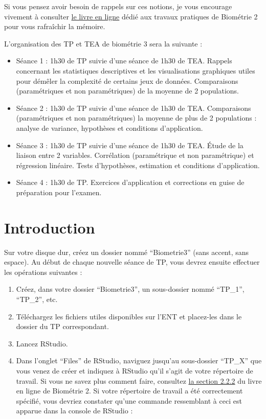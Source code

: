 \documentclass[
  a4paper,
]{article}
\providecommand{\tightlist}{%
  \setlength{\itemsep}{0pt}\setlength{\parskip}{0pt}}
\begin{document}
Si vous pensez avoir besoin de rappels sur ces notions, je vous encourage vivement à consulter \href{https://besibo.github.io/Biometrie2/}{le livre en ligne} dédié aux travaux pratiques de Biométrie 2 pour vous rafraîchir la mémoire.

L'organisation des TP et TEA de biométrie 3 sera la suivante :

\begin{itemize}
\tightlist
\item
  Séance 1 : 1h30 de TP suivie d'une séance de 1h30 de TEA. Rappels concernant les statistiques descriptives et les visualisations graphiques utiles pour démêler la complexité de certains jeux de données. Comparaisons (paramétriques et non paramétriques) de la moyenne de 2 populations.
\item
  Séance 2 : 1h30 de TP suivie d'une séance de 1h30 de TEA. Comparaisons (paramétriques et non paramétriques) la moyenne de plus de 2 populations : analyse de variance, hypothèses et conditions d'application.
\item
  Séance 3 : 1h30 de TP suivie d'une séance de 1h30 de TEA. Étude de la liaison entre 2 variables. Corrélation (paramétrique et non paramétrique) et régression linéaire. Tests d'hypothèses, estimation et conditions d'application.
\item
  Séance 4 : 1h30 de TP. Exercices d'application et corrections en guise de préparation pour l'examen.
\end{itemize}

\hypertarget{intro}{%
\section{Introduction}\label{intro}}

Sur votre disque dur, créez un dossier nommé ``Biometrie3'' (sans accent, sans espace).
Au début de chaque nouvelle séance de TP, vous devrez ensuite effectuer les opérations suivantes :

\begin{enumerate}
\def\labelenumi{\arabic{enumi}.}
\tightlist
\item
  Créez, dans votre dossier ``Biometrie3'', un sous-dossier nommé ``TP\_1'', ``TP\_2'', etc.
\item
  Téléchargez les fichiers utiles disponibles sur l'ENT et placez-les dans le dossier du TP correspondant.
\item
  Lancez RStudio.
\item
  Dans l'onglet ``Files'' de RStudio, naviguez jusqu'au sous-dossier ``TP\_X'' que vous venez de créer et indiquez à RStudio qu'il s'agit de votre répertoire de travail. Si vous ne savez plus comment faire, consultez \href{https://besibo.github.io/Biometrie2/bases.html\#le-repertoire-de-travail}{la section 2.2.2} du livre en ligne de Biométrie 2. Si votre répertoire de travail a été correctement spécifié, vous devriez constater qu'une commande ressemblant à ceci est apparue dans la console de RStudio :
\end{enumerate}
\end{document}
